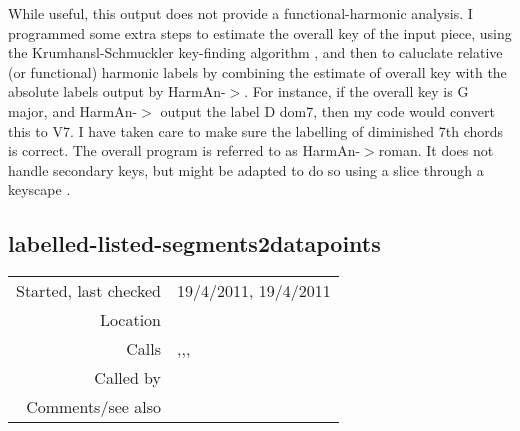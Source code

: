 While useful, this output does not provide a
functional-harmonic analysis. I programmed some extra
steps to estimate the overall key of the input piece,
using the Krumhansl-Schmuckler key-finding algorithm
\cite{krumhansl1990}, and then to caluclate relative
(or functional) harmonic labels by combining the
estimate of overall key with the absolute labels
output by HarmAn-$>$. For instance, if the overall
key is G major, and HarmAn-$>$ output the label D
dom7, then my code would convert this to V7. I have
taken care to make sure the labelling of diminished
7th chords is correct. The overall program is
referred to as HarmAn-$>$roman. It does not handle
secondary keys, but might be adapted to do so using
a slice through a keyscape \cite{sapp2005}.


\subsection*{labelled-listed-segments2datapoints}\label{fun:labelled-listed-segments2datapoints}

\vspace{0.3cm}
\begin{tabular}{r|p{8cm}}
Started, last checked & 19/4/2011, 19/4/2011 \\
Location & \nameref{sec:chord-labelling} \\
Calls & \nameref{fun:HarmAn->labelling},\newline \nameref{fun:labelled-listed-segments2datapoints},\newline \nameref{fun:resolve-dim7s}, \nameref{fun:segments-strict} \\
Called by & \nameref{fun:labelled-listed-segments2datapoints} \\
Comments/see also &
\end{tabular}

